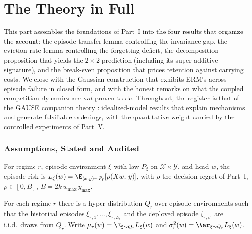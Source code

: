 \part{The Theory in Full}

This part assembles the foundations of Part~I into the four results that
organize the \nm{} account: the episode-transfer lemma controlling the
invariance gap, the eviction-rate lemma controlling the forgetting
deficit, the decomposition proposition that yields the $2{\times}2$
prediction (including its super-additive signature), and the break-even
proposition that prices retention against carrying costs. We close with
the Gaussian construction that exhibits ERM's across-episode failure in
closed form, and with the honest remarks on what the coupled competition
dynamics are \emph{not} proven to do. Throughout, the register is that of
the GAUSE companion theory \cite{li2026gause}: idealized-model results
that explain mechanisms and generate falsifiable orderings, with the
quantitative weight carried by the controlled experiments of Part~V.

\section{Assumptions, Stated and Audited}
\label{sec:dd4-assumptions}

\begin{definition}
\label{def:dd4-risk}
For regime $r$, episode environment $\xi$ with law $P_\xi$ on
$\mathcal{X} \times \mathcal{Y}$, and head $w$, the episode risk is
$L_\xi(w) = \E_{(x,y) \sim P_\xi}[\rho(Xw;\, y)]$, with $\rho$ the
decision regret of Part~I, $\rho \in [0, B]$,
$B = 2 k\, w_{\max}\, y_{\max}$.
\end{definition}

\begin{definition}
\label{def:dd4-a1}
For each regime $r$ there is a hyper-distribution $Q_r$ over episode
environments such that the historical episodes
$\xi_{r,1}, \dots, \xi_{r,E_r}$ and the deployed episode $\xi_{r,e'}$
are i.i.d.\ draws from $Q_r$. Write
$\mu_r(w) = \E_{\xi \sim Q_r} L_\xi(w)$ and
$\sigma_r^2(w) = \Var_{\xi \sim Q_r} L_\xi(w)$.
\end{definition}

